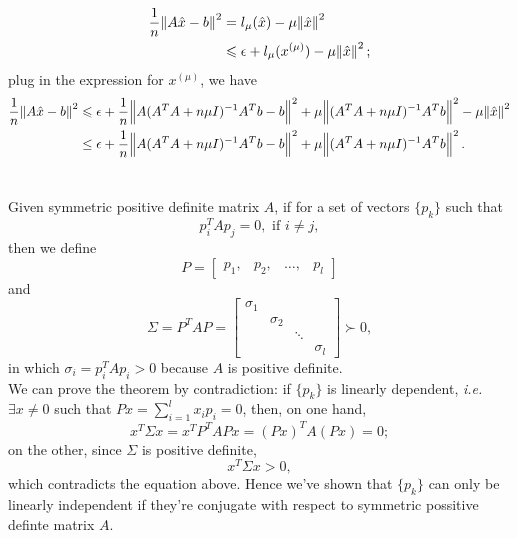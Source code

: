 \documentclass[11pt]{article}
\begin{document}
\subsection{}
\begin{equation}\begin{split}
\frac1n\norm{A\hat x-b}^2 &= l_{\mu}(\hat x)-\mu\norm{\hat x}^2 \\
&\leqslant \epsilon+l_{\mu}(x^{(\mu)})- \mu\norm{\hat x}^2;
\end{split}\nonumber\end{equation}
plug in the expression for $x^{(\mu)}$, we have
\begin{equation}\begin{split} 
\frac1n\norm{A\hat x - b}^2 &\leqslant \epsilon +\frac1n \norm{A(A^TA+n\mu I)^{-1}A^Tb-b}^2+\mu\norm{(A^TA+n\mu I)^{-1}A^Tb}^2-\mu\norm{\hat x}^2\\
&\leq \epsilon +\frac1n \norm{A(A^TA+n\mu I)^{-1}A^Tb-b}^2+\mu\norm{(A^TA+n\mu I)^{-1}A^Tb}^2.
\end{split}\nonumber\end{equation} 


\section{}
Given symmetric positive definite matrix $A$, if for a set of vectors $\{p_k\}$ such that
$$p_i^TAp_j=0,\,\,\text{if}\,\,i\neq j,$$
then we define
$$P = \begin{bmatrix} p_1, & p_2, & \dots ,& p_l\end{bmatrix} $$
and
$$\Sigma = P^TAP = \begin{bmatrix} \sigma_1 \\ & \sigma_2 \\ & & \ddots \\ & & & \sigma_l \end{bmatrix}\succ0, $$
in which $\sigma_i = p_i^TAp_i > 0$ because $A$ is positive definite.\\[0.4cm]
We can prove the theorem by contradiction: if $\{p_k\}$ is linearly dependent, \textit{i.e.} $\exists x \neq 0$ such that $Px = \sum_{i=1}^lx_ip_i=0$, then, on one hand, 
\begin{equation} 
x^T\Sigma x = x^TP^TAPx = (Px)^TA(Px) = 0;
\nonumber\end{equation} 
on the other, since $\Sigma$ is positive definite, 
$$x^T\Sigma x > 0,$$
which contradicts the equation above. Hence we've shown that $\{p_k\}$ can only be linearly independent if they're conjugate with respect to symmetric possitive definte matrix $A$.
\end{document}
